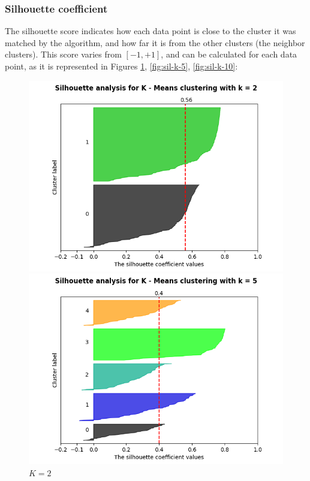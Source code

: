 \documentclass[12pt]{article}
\begin{document}
\subsubsection{Silhouette coefficient}

The silhouette score indicates how each data point is close to the cluster it was matched by the algorithm, and how far it is from the other clusters (the neighbor clusters). This score varies from $[-1, +1]$, and can be calculated for each data point, as it is represented in Figures \ref{fig:sil-k-2}, \ref{fig:sil-k-5}, \ref{fig:sil-k-10}: \\

\begin{figure}[H]
   \begin{minipage}{0.32\textwidth}
     \centering
     \includegraphics[width=\linewidth]{assignment-1/plots/task-1/silhouette-plot-k-2.png}
     \caption{$K = 2$}
     \label{fig:sil-k-2}
   \end{minipage}\hfill
   \begin{minipage}{0.32\textwidth}
     \centering
     \includegraphics[width=\linewidth]{assignment-1/plots/task-1/silhouette-plot-k-5.png}

\end{minipage}
\end{figure}
\end{document}
